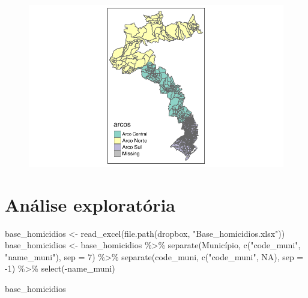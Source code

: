 \documentclass[
  letterpaper,
  DIV=11,
  numbers=noendperiod]{scrartcl}
\newenvironment{Shaded}{\begin{snugshade}}{\end{snugshade}}
\newcommand{\AttributeTok}[1]{\textcolor[rgb]{0.40,0.45,0.13}{#1}}
\newcommand{\ConstantTok}[1]{\textcolor[rgb]{0.56,0.35,0.01}{#1}}
\newcommand{\DecValTok}[1]{\textcolor[rgb]{0.68,0.00,0.00}{#1}}
\newcommand{\FunctionTok}[1]{\textcolor[rgb]{0.28,0.35,0.67}{#1}}
\newcommand{\NormalTok}[1]{\textcolor[rgb]{0.00,0.23,0.31}{#1}}
\newcommand{\OtherTok}[1]{\textcolor[rgb]{0.00,0.23,0.31}{#1}}
\newcommand{\SpecialCharTok}[1]{\textcolor[rgb]{0.37,0.37,0.37}{#1}}
\newcommand{\StringTok}[1]{\textcolor[rgb]{0.13,0.47,0.30}{#1}}
\begin{document}
\begin{figure}[H]

{\centering \includegraphics{maps_files/figure-pdf/unnamed-chunk-9-1.pdf}

}

\end{figure}

\hypertarget{anuxe1lise-exploratuxf3ria}{%
\section{Análise exploratória}\label{anuxe1lise-exploratuxf3ria}}

\begin{Shaded}
\begin{Highlighting}[]
\NormalTok{base\_homicidios }\OtherTok{\textless{}{-}} \FunctionTok{read\_excel}\NormalTok{(}\FunctionTok{file.path}\NormalTok{(dropbox, }\StringTok{"Base\_homicidios.xlsx"}\NormalTok{))}
\NormalTok{base\_homicidios }\OtherTok{\textless{}{-}}\NormalTok{ base\_homicidios }\SpecialCharTok{\%\textgreater{}\%}
  \FunctionTok{separate}\NormalTok{(Município, }\FunctionTok{c}\NormalTok{(}\StringTok{"code\_muni"}\NormalTok{, }\StringTok{"name\_muni"}\NormalTok{), }\AttributeTok{sep =} \DecValTok{7}\NormalTok{) }\SpecialCharTok{\%\textgreater{}\%}
  \FunctionTok{separate}\NormalTok{(code\_muni, }\FunctionTok{c}\NormalTok{(}\StringTok{"code\_muni"}\NormalTok{, }\ConstantTok{NA}\NormalTok{), }\AttributeTok{sep =} \SpecialCharTok{{-}}\DecValTok{1}\NormalTok{) }\SpecialCharTok{\%\textgreater{}\%}
  \FunctionTok{select}\NormalTok{(}\SpecialCharTok{{-}}\NormalTok{name\_muni)}

\NormalTok{base\_homicidios}
\end{Highlighting}
\end{Shaded}
\end{document}

